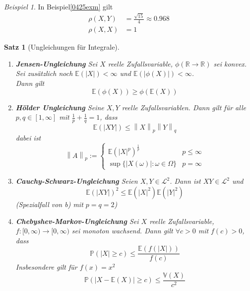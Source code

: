 \documentclass[10pt,a4paper]{article}
\newcommand{\R}{\ensuremath{\mathbb{R}}}
\newcommand{\norm}[1]{\left\|#1\right\|}
\newcommand{\Prb}{\mathbb P}
\newcommand{\Epv}{\ensuremath{\mathbb{E}}}
\newcommand{\Var}{\mathbb{V}}
\newcommand{\Kor}{\rho}
\newcommand{\scL}{\mathscr L}
\theoremstyle{plain}
\newtheorem{satz}[theorem]{Satz}
\theoremstyle{definition}
\theoremstyle{remark}
\newtheorem{exm}[theorem]{Beispiel}
\begin{document}
	\begin{exm}
		In Beispiel\ref{0425exm} gilt
		\begin{align*}
		\Kor(X,Y)&=\frac{\sqrt{15}}{4}\approx0.968\\
		\Kor(X,X)&=1
		\end{align*}
	\end{exm}

	\begin{satz}[Ungleichungen für Integrale]\label{0428intUngl}
		\begin{enumerate}
			\item \textbf{Jensen-Ungleichung} Sei $X$ reelle Zufallsvariable, $\phi(\R\to\R)$ sei konvex.\\
			Sei zusätzlich noch $\Epv(|X|)<\infty$ und $\Epv(|\phi(X)|)<\infty$.\\
			Dann gilt
			\[\Epv(\phi(X))\geq \phi(\Epv(X))\]
			\item\textbf{Hölder Ungleichung} Seine $X,Y$ reelle Zufallsvariablen. Dann gilt für alle $p,q\in[1,\infty]$ mit $\frac{1}{p}+\frac{1}{q}=1$, dass
			\[\Epv(|XY|)\leq\norm{X}_p\norm{Y}_q\]
			dabei ist 
			\[\norm{A}_p:=\begin{cases}
			\Epv(|X|^p)^\frac{1}{p}&p\leq \infty\\
			\sup\{|X(\omega)|:\omega\in\Omega\}&p=\infty
			\end{cases}\]
			\item\textbf{Cauchy-Schwarz-Ungleichung} Seien $X,Y\in\scL^2$. Dann ist $XY\in\scL^2$ und\[\Epv(|XY|)^2\leq\Epv(|X|^2)\Epv(|Y|^2)\]
			(Spezialfall von b) mit $p=q=2$)
			\item \label{chebyshev-markov}
			\textbf{Chebyshev-Markov-Ungleichung} Sei $X$ reelle Zufallsvariable, $f:[0,\infty)\to[0,\infty)$ sei monoton wachsend. Dann gilt $\forall c>0$ mit $f(c)>0$, dass\[\Prb(|X|\geq c)\leq\frac{\Epv(f(|X|))}{f(c)}\]
			Insbesondere gilt für $f(x)=x^2$
			\[\Prb(|X-\Epv(X)|\geq c)\leq\frac{\Var(X)}{c^2}\]
		\end{enumerate}
	\end{satz}
\end{document}
